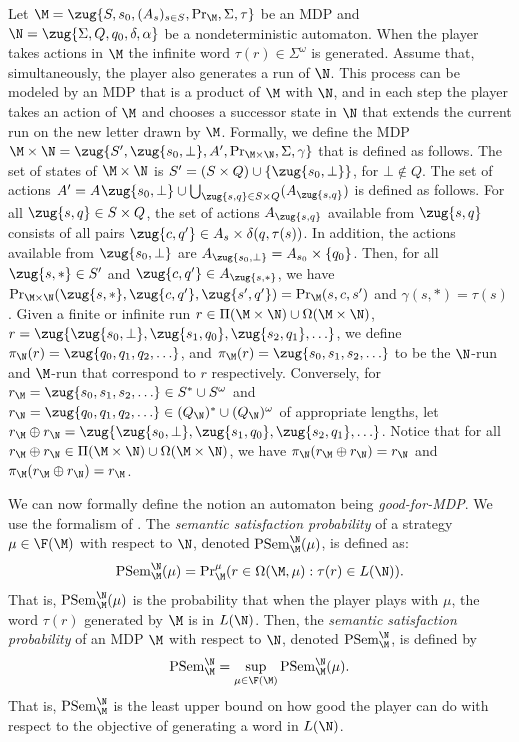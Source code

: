 \documentclass{lmcs}
\newcommand{\set}[1]{\{ #1 \}}
\begin{document}
Let $\M=\zug{S,s_0,(A_s)_{s\in S},\Pr_\M,\Sigma,\tau}$ be an MDP and $\N=\zug{\Sigma,Q,q_0,\delta,\alpha}$ be a nondeterministic automaton. When the player takes actions in $\M$ the infinite word $\tau(r)\in \Sigma^\omega$ is generated. Assume that, simultaneously, the player also generates a run of $\N$. This process can be modeled by an MDP that is a product of $\M$ with $\N$, and in each step the player takes an action of $\M$ and chooses a successor state in $\N$ that extends the current run on the new letter drawn by $\M$. Formally, we define the MDP $\M\times \N=\zug{S',\zug{s_0,\bot},A',\Pr_{\M\times \N},\Sigma,\gamma}$ that is defined as follows. The set of states of $\M\times \N$ is $S'=(S\times Q)\cup \set{\zug{s_0,\bot}}$, for $\bot\notin Q$. The set of actions $A'=A_{}\zug{s_0,\bot}\cup \bigcup_{\zug{s,q}\in S\times Q}(A_{\zug{s,q}})$ is defined as follows. For all $\zug{s,q}\in S\times Q$, the set of actions $A_{\zug{s,q}}$ available from $\zug{s,q}$ consists of all pairs $\zug{c,q'}\in A_s\times \delta(q,\tau(s))$. In addition, the actions available from $\zug{s_0,\bot}$ are $A_{\zug{s_0,\bot}}=A_{s_0}\times \set{q_0}$. Then, for all $\zug{s,\ast}\in S'$ and $\zug{c,q'}\in A_{\zug{s,\ast}}$, we have $\Pr_{\M\times \N}(\zug{s,\ast},\zug{c,q'},\zug{s',q'})=\Pr_{\M}(s,c,s')$ and $\gamma(s,\ast)=\tau(s)$.
Given a finite or infinite run $r\in \Pi(\M\times \N)\cup \Omega(\M\times \N)$, $r=\zug{\zug{s_0,\bot},\zug{s_1,q_0},\zug{s_2,q_1},\ldots}$, we define $\pi_\N(r)=\zug{q_0,q_1,q_2,\ldots}$, and $\pi_\M(r)=\zug{s_0,s_1,s_2,\ldots}$ to be the $\N$-run and $\M$-run that correspond to $r$ respectively. Conversely, for $r_\M=\zug{s_0,s_1,s_2,\ldots}\in S^*\cup S^\omega$ and $r_\N=\zug{q_0,q_1,q_2,\ldots}\in (Q_\N)^*\cup (Q_\N)^\omega$ 
of appropriate lengths, let $r_\M\oplus r_\N=\zug{\zug{s_0,\bot},\zug{s_1,q_0},\zug{s_2,q_1},\ldots}$. Notice that for all $r_\M\oplus r_\N\in \Pi(\M\times \N)\cup \Omega(\M\times \N)$, we have $\pi_\N(r_\M\oplus r_\N)=r_\N$ and $\pi_\M(r_\M\oplus r_\N)=r_\M$.

We can now formally define the notion an automaton being \emph{good-for-MDP}. We use the formalism of \cite{HPSSTWW20}.
The \emph{semantic satisfaction probability\/} of a strategy $\mu\in \F(\M)$ with respect to $\N$, denoted $\mathrm{PSem}^\N_\M(\mu)$, is defined as:
\[
\mathrm{PSem}^\N_\M(\mu)={\Pr}_\M^\mu(r\in \Omega(\M,\mu) : \tau(r)\in L(\N)).
\]
That is, $\mathrm{PSem}^\N_\M(\mu)$ is the probability that when the player plays with $\mu$, the word $\tau(r)$ generated by $\M$ is in $L(\N)$. 
Then, the \emph{semantic satisfaction probability} of an MDP $\M$ with respect to $\N$, denoted $\mathrm{PSem}^\N_\M$, is defined by
\[
\mathrm{PSem}^\N_\M=\sup_{\mu\in \F(\M)}\mathrm{PSem}^\N_\M(\mu).
\]
That is, $\mathrm{PSem}^\N_\M$ is the least upper bound on how good the player can do with respect to the objective of generating a word in $L(\N)$. 
\end{document}
